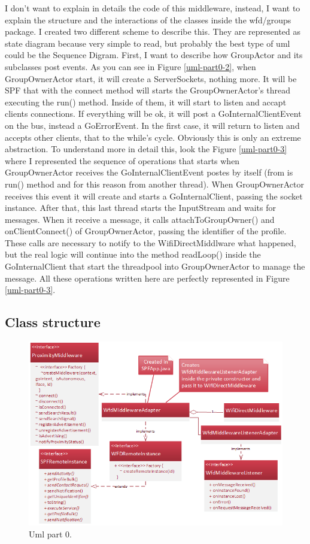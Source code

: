 I don't want to explain in details the code of this middleware, instead, I want to explain the structure and the interactions of the classes inside the wfd/groups package.
I created two different scheme to describe this. They are represented as state diagram because very simple to read, but probably the best type of uml could be the Sequence Digram.
First, I want to describe how GroupActor and its subclasses post events. As you can see in Figure \ref{uml-part0-2}, when GroupOwnerActor start, it will create a ServerSockets, nothing more.
It will be SPF that with the connect method will starts the GroupOwnerActor's thread executing the run() method. Inside of them, it will start to listen and accapt clients connections. If everything will be ok, it will post a GoInternalClientEvent on the bus, instead a GoErrorEvent. In the first case, it will return to listen and accepts other clients, that to the while's cycle. Obviously this is only an extreme abstraction. To understand more in detail this, look the Figure \ref{uml-part0-3} where I represented the sequence of operations that starts when GroupOwnerActor receives the GoInternalClientEvent postes by itself (from is run() method and for this reason from another thread).
When GroupOwnerActor receives this event it will create and starts a GoInternalClient, passing the socket instance.
After that, this last thread starts the InputStream and waits for messages. 
When it receive a message, it calls attachToGroupOwner() and onClientConnect() of GroupOwnerActor, passing the identifier of the profile. These calls are necessary to notify to the WifiDirectMiddlware what happened, but the real logic will continue into the method readLoop() inside the GoInternalClient that start the threadpool into GroupOwnerActor to manage the message.
All these operations written here are perfectly represented in Figure \ref{uml-part0-3}.


\subsection{Class structure}

\begin{figure}[thpb]
	\centering
	\includegraphics[scale=0.5]{./images/chap2/uml-parte1.png}
	\caption{Uml part 0.}
	\label{uml-part1}
\end{figure}	

